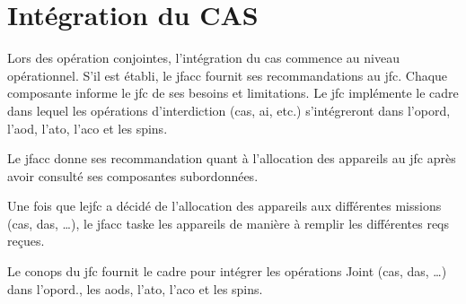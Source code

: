 \section{Intégration du CAS}

Lors des opération conjointes, l'intégration du \gls{cas} commence au niveau opérationnel. S'il est établi, le \gls{jfacc} fournit ses recommandations au \gls{jfc}. Chaque composante informe le \gls{jfc} de ses besoins et limitations. Le \gls{jfc} implémente le cadre dans lequel les opérations d'interdiction (\gls{cas}, \gls{ai}, etc.) s'intégreront dans l'\gls{opord}, l'\gls{aod}, l'\gls{ato}, l'\gls{aco} et les \gls{spins}.

Le \gls{jfacc} donne ses recommandation quant à l'allocation des appareils au \gls{jfc} après avoir consulté ses composantes subordonnées.

Une fois que le\gls{jfc} a décidé de l'allocation des appareils aux différentes missions (\gls{cas}, \gls{das}, \ldots{}), le \gls{jfacc} taske les appareils de manière à remplir les différentes \glspl{req} reçues.

Le \gls{conops} du \gls{jfc} fournit le cadre pour intégrer les opérations Joint (\gls{cas}, \gls{das}, \ldots{}) dans l'\gls{opord}., les \glspl{aod}, l'\gls{ato}, l'\gls{aco} et les \gls{spins}.

